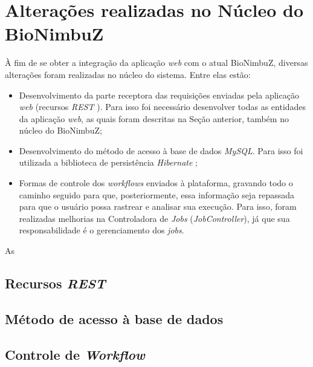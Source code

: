 \section{Alterações realizadas no Núcleo do BioNimbuZ} \label{cap5sec6}   

À fim de se obter a integração da aplicação \textit{web} com o atual BioNimbuZ, diversas alterações foram realizadas no núcleo do sistema. Entre elas estão: 

\begin{itemize}
	\item Desenvolvimento da parte receptora das requisições enviadas pela aplicação \textit{web} (recursos \textit{REST} \cite{rest}). Para isso foi necessário desenvolver todas as entidades da aplicação \textit{web}, as quais foram descritas na Seção anterior, também no núcleo do BioNimbuZ;
	\item Desenvolvimento do método de acesso à base de dados \textit{MySQL}. Para isso foi utilizada a biblioteca de persistência \textit{Hibernate} \cite{hibernate_url};
	\item Formas de controle dos \textit{workflows} enviados à plataforma, gravando todo o caminho seguido para que, posteriormente, essa informação seja repassada para que o usuário possa rastrear e analisar sua execução. Para isso, foram realizadas melhorias na Controladora de \textit{Jobs} (\textit{JobController}), já que sua responsabilidade é o gerenciamento dos \textit{jobs}.
\end{itemize}

As

\subsection{Recursos \textit{REST}} \label{cap5sec6subsec1}
 

\subsection{Método de acesso à base de dados} \label{cap5sec6subsec2}


\subsection{Controle de \textit{Workflow}} \label{cap5sec6subsec3}


